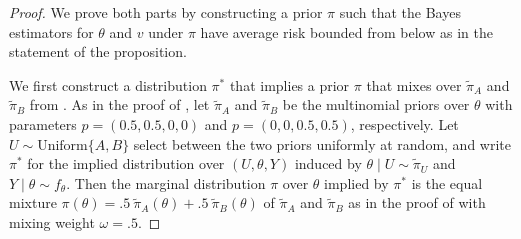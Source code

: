 \documentclass[12pt,reqno]{amsart}
\theoremstyle{theorem}
\theoremstyle{definition}
\newcommand{\0}{\mathbf{0}}
\newcommand{\1}{\mathbf{1}}
\begin{document}
\begin{proof}

    We prove both parts by constructing a prior $\pi$ such that the Bayes estimators for $\theta$ and $v$ under $\pi$ have average risk bounded from below as in the statement of the proposition.

    We first construct a distribution $\pi^*$ that implies a prior $\pi$ that mixes over $\tilde{\pi}_A$ and $\tilde{\pi}_B$ from .
    As in the proof of , let $\tilde{\pi}_A$ and $\tilde{\pi}_B$ be the multinomial priors over $\theta$ with parameters $p = (0.5,0.5,0,0)$ and $p = (0,0,0.5,0.5)$, respectively.
    Let $U \sim \text{Uniform}\{A,B\}$ select between the two priors uniformly at random, and write $\pi^*$ for the implied distribution over $(U,\theta,Y)$ induced by $\theta \mid U \sim \tilde{\pi}_U$ and $Y \mid \theta \sim f_\theta$.
    Then the marginal distribution $\pi$ over $\theta$ implied by $\pi^*$ is the equal mixture $\pi(\theta) = .5 \: \tilde{\pi}_A(\theta) + .5 \: \tilde{\pi}_B(\theta)$ of $\tilde{\pi}_A$ and $\tilde{\pi}_B$ as in the proof of  with mixing weight $\omega = .5$.


\end{proof}
\end{document}

